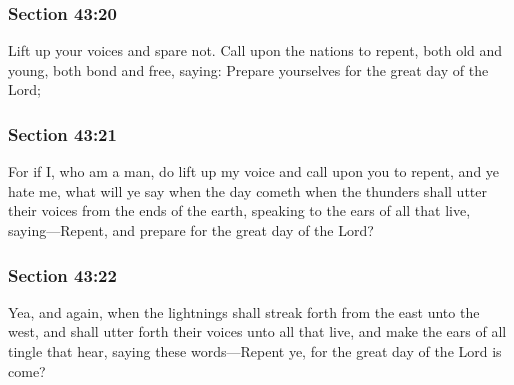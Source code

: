	\subsubsection{Section 43:20} %
		\label{DC43-20}

		Lift up your voices and spare not.  Call upon the nations to repent, both old and young, both bond and free, saying: Prepare yourselves for the great day of the Lord;


	\subsubsection{Section 43:21} %
		\label{DC43-21}

		For if I, who am a man, do lift up my voice and call upon you to repent, and ye hate me, what will ye say when the day cometh when the thunders shall utter their voices from the ends of the earth, speaking to the ears of all that live, saying---Repent, and prepare for the great day of the Lord?


	\subsubsection{Section 43:22} %
		\label{DC43-22}

		Yea, and again, when the lightnings shall streak forth from the east unto the west, and shall utter forth their voices unto all that live, and make the ears of all tingle that hear, saying these words---Repent ye, for the great day of the Lord is come?

